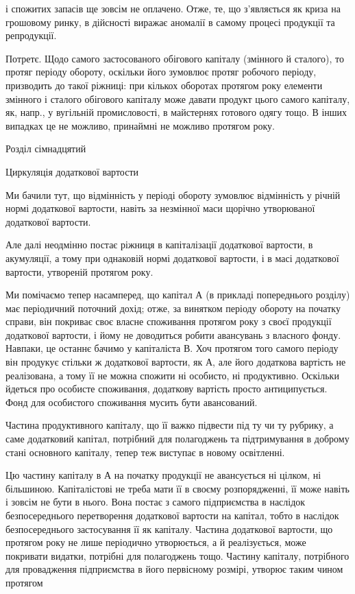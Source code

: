 \parcont{}  %
і спожитих запасів ще зовсім не оплачено. Отже, те, що з’являється
як криза на грошовому ринку, в дійсності виражає аномалії в самому процесі
продукції та репродукції.

Потретє. Щодо самого застосованого обігового капіталу (змінного
й сталого), то протяг періоду обороту, оскільки його зумовлює протяг
робочого періоду, призводить до такої ріжниці: при кількох оборотах
протягом року елементи змінного і сталого обігового капіталу може
давати продукт цього самого капіталу, як, напр., у вугільній промисловості,
в майстернях готового одягу тощо. В інших випадках це не можливо,
принаймні не можливо протягом року.

Розділ сімнадцятий

Циркуляція додаткової вартости

Ми бачили тут, що відмінність у періоді обороту зумовлює відмінність
у річній нормі додаткової вартости, навіть за незмінної маси щорічно
утворюваної додаткової вартости.

Але далі неодмінно постає ріжниця в капіталізації додаткової вартости,
в акумуляції, а тому при однаковій нормі додаткової вартости,
і в масі додаткової вартости, утвореній протягом року.

Ми помічаємо тепер насамперед, що капітал А (в прикладі попереднього
розділу) має періодичний поточний дохід; отже, за винятком періоду
обороту на початку справи, він покриває своє власне споживання
протягом року з своєї продукції додаткової вартости, і йому не доводиться
робити авансувань з власного фонду. Навпаки, це останнє
бачимо у капіталіста В. Хоч протягом того самого періоду він продукує
стільки ж додаткової вартости, як А, але його додаткова вартість не
реалізована, а тому її не можна спожити ні особисто, ні продуктивно. Оскільки
йдеться про особисте споживання, додаткову вартість просто антиципується.
Фонд для особистого споживання мусить бути авансований.

Частина продуктивного капіталу, що її важко підвести під ту чи ту
рубрику, а саме додатковий капітал, потрібний для полагоджень та підтримування
в доброму стані основного капіталу, тепер теж виступає в
новому освітленні.

Цю частину капіталу в А на початку продукції не авансується ні
цілком, ні більшиною. Капіталістові не треба мати її в своєму розпорядженні,
її може навіть і зовсім не бути в нього. Вона постає з самого
підприємства в наслідок безпосереднього перетворення додаткової вартости
на капітал, тобто в наслідок безпосереднього застосування її як капіталу.
Частина додаткової вартости, що протягом року не лише періодично
утворюється, а й реалізується, може покривати видатки, потрібні для
полагоджень тощо. Частину капіталу, потрібного для провадження підприємства
в його первісному розмірі, утворює таким чином протягом
\parbreak{}  %
